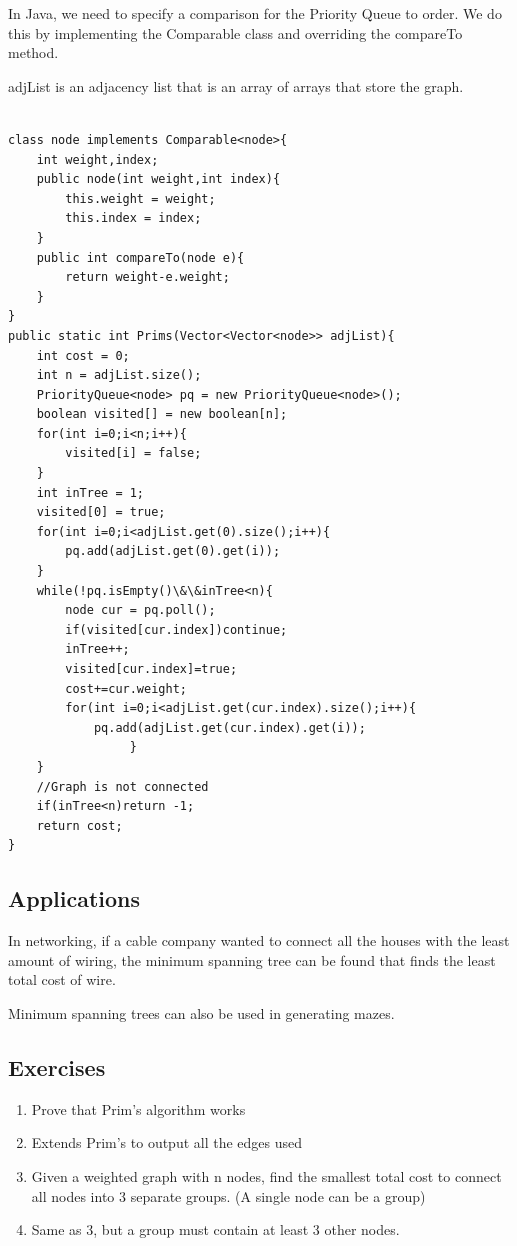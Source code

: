 \documentclass[11pt,oneside]{book}
\begin{document}
In Java, we need to specify a comparison for the Priority Queue to order. We do this by implementing the Comparable class and overriding the compareTo method.

adjList is an adjacency list that is an array of arrays that store the graph.

\begin{lstlisting}

class node implements Comparable<node>{
    int weight,index;
    public node(int weight,int index){
        this.weight = weight;
        this.index = index;
    }
    public int compareTo(node e){
        return weight-e.weight;
    }
}
public static int Prims(Vector<Vector<node>> adjList){
    int cost = 0;
    int n = adjList.size();
    PriorityQueue<node> pq = new PriorityQueue<node>();
    boolean visited[] = new boolean[n];
    for(int i=0;i<n;i++){
        visited[i] = false;
    }
    int inTree = 1;
    visited[0] = true;
    for(int i=0;i<adjList.get(0).size();i++){
        pq.add(adjList.get(0).get(i));
    }
    while(!pq.isEmpty()\&\&inTree<n){
        node cur = pq.poll();
        if(visited[cur.index])continue;
        inTree++;
        visited[cur.index]=true;
        cost+=cur.weight;
        for(int i=0;i<adjList.get(cur.index).size();i++){
            pq.add(adjList.get(cur.index).get(i));          
                 }
    }
    //Graph is not connected
    if(inTree<n)return -1;
    return cost;
}
\end{lstlisting}

\subsection{Applications}

In networking, if a cable company wanted to connect all the houses with the least amount of wiring, the minimum spanning tree can be found that finds the least total cost of wire.

Minimum spanning trees can also be used in generating mazes.

\subsection{Exercises}

\begin{enumerate}
\item Prove that Prim's algorithm works
\item Extends Prim's to output all the edges used
\item Given a weighted graph with n nodes, find the smallest total cost to connect all nodes into 3 separate groups. (A single node can be a group)
\item Same as 3, but a group must contain at least 3 other nodes.
\end{enumerate}
\end{document}
